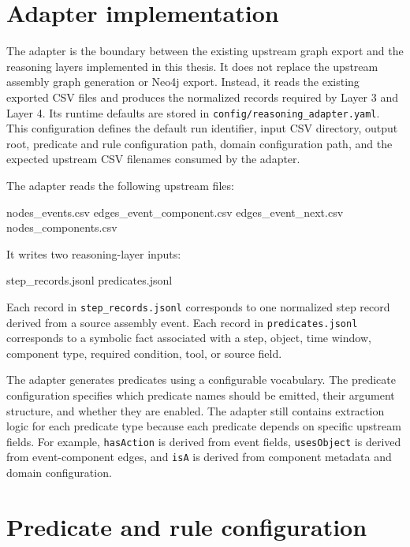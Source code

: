 \section{Adapter implementation}
\label{sec:implementation-adapter}

The adapter is the boundary between the existing upstream graph export and the reasoning layers implemented in this thesis. It does not replace the upstream assembly graph generation or Neo4j export. Instead, it reads the existing exported CSV files and produces the normalized records required by Layer 3 and Layer 4. Its runtime defaults are stored in \texttt{config/reasoning\_adapter.yaml}. This configuration defines the default run identifier, input CSV directory, output root, predicate and rule configuration path, domain configuration path, and the expected upstream CSV filenames consumed by the adapter.

The adapter reads the following upstream files:

\begin{Code}
    nodes_events.csv
    edges_event_component.csv
    edges_event_next.csv
    nodes_components.csv
\end{Code}

It writes two reasoning-layer inputs:

\begin{Code}
    step_records.jsonl
    predicates.jsonl
\end{Code}

Each record in \texttt{step\_records.jsonl} corresponds to one normalized step record derived from a source assembly event. Each record in \texttt{predicates.jsonl} corresponds to a symbolic fact associated with a step, object, time window, component type, required condition, tool, or source field.

The adapter generates predicates using a configurable vocabulary. The predicate configuration specifies which predicate names should be emitted, their argument structure, and whether they are enabled. The adapter still contains extraction logic for each predicate type because each predicate depends on specific upstream fields. For example, \texttt{hasAction} is derived from event fields, \texttt{usesObject} is derived from event-component edges, and \texttt{isA} is derived from component metadata and domain configuration.

\section{Predicate and rule configuration}
\label{sec:implementation-predicate-rule-config}

